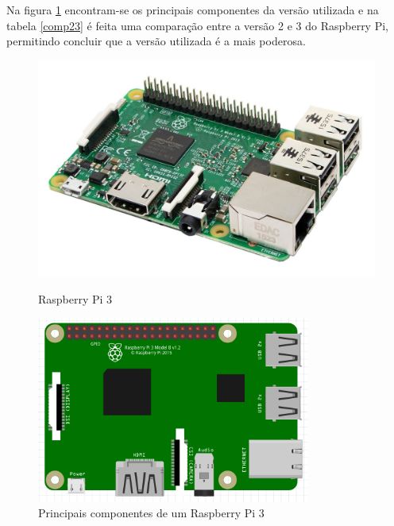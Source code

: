 Na figura \ref{comprasp1} encontram-se os principais componentes da versão utilizada e na tabela \ref{comp23} é feita uma comparação entre a versão 2 e 3 do Raspberry Pi, permitindo concluir que a versão utilizada é a mais poderosa. 

\begin{figure}[h]
	\centering
	\begin{minipage}[b]{0.49\textwidth}
		\centering
		\includegraphics[width=\textwidth]{img/hardware/rasp3-img.jpg}
		\caption{Raspberry Pi 3}
		\label{rasp1}
	\end{minipage}
	\hfill
	\begin{minipage}[b]{0.49\textwidth}
		\centering
		\includegraphics[width=0.8\textwidth]{img/hardware/rasp-esquema.PNG}
		\caption{Principais componentes de um Raspberry Pi 3 }
		\label{comprasp1}
		
	\end{minipage}
\end{figure}

